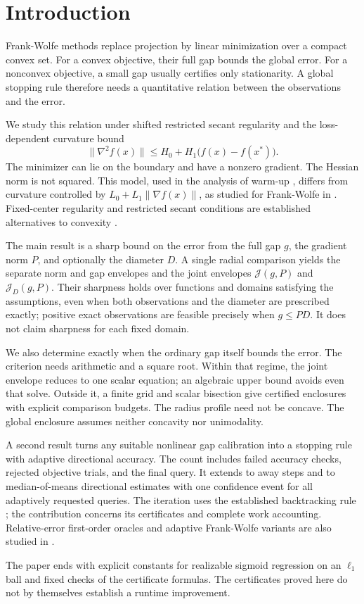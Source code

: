 \section{Introduction}
Frank-Wolfe methods replace projection by linear minimization over a
compact convex set. For a convex objective, their full gap bounds the
global error. For a nonconvex objective, a small gap usually certifies
only stationarity. A global stopping rule therefore needs a quantitative
relation between the observations and the error.

We study this relation under shifted restricted secant regularity and
the loss-dependent curvature bound
\[
 \|\nabla^2 f(x)\|\le H_0+H_1\bigl(f(x)-f(x^*)\bigr).
\]
The minimizer can lie on the boundary and have a nonzero gradient.
The Hessian norm is not squared. This model, used in the analysis of
warm-up \cite{warmup}, differs from curvature controlled by
$L_0+L_1\|\nabla f(x)\|$, as studied for Frank-Wolfe in
\cite{vyguzov}. Fixed-center regularity and restricted secant
conditions are established alternatives to convexity
\cite{regregularity,rsipep}.

The main result is a sharp bound on the error from the full gap $g$,
the gradient norm $P$, and optionally the diameter $D$. A single radial
comparison yields the separate norm and gap envelopes and the joint
envelopes $\mathcal J(g,P)$ and $\mathcal J_D(g,P)$. Their sharpness
holds over functions and domains satisfying the assumptions, even when
both observations and the diameter are prescribed exactly; positive
exact observations are feasible precisely when $g\le PD$. It does not
claim sharpness for each fixed domain.

We also determine exactly when the ordinary gap itself bounds the error.
The criterion needs arithmetic and a square root. Within that regime,
the joint envelope reduces to one scalar equation; an algebraic upper
bound avoids even that solve. Outside it, a finite grid and scalar
bisection give certified enclosures with explicit comparison budgets.
The radius profile need not be concave. The global enclosure assumes
neither concavity nor unimodality.

A second result turns any suitable nonlinear gap calibration into a
stopping rule with adaptive directional accuracy. The count includes
failed accuracy checks, rejected objective trials, and the final query.
It extends to away steps and to median-of-means directional estimates
with one confidence event for all adaptively requested queries.
The iteration uses the established backtracking rule
\cite{pedregosa,lacostejaggi}; the contribution concerns its certificates
and complete work accounting. Relative-error first-order oracles and
adaptive Frank-Wolfe variants are also studied in
\cite{oraclehallak,oracledenisov}.

The paper ends with explicit constants for realizable sigmoid regression
on an $\ell_1$ ball and fixed checks of the certificate formulas.
The certificates proved here do not by themselves establish a runtime
improvement.
